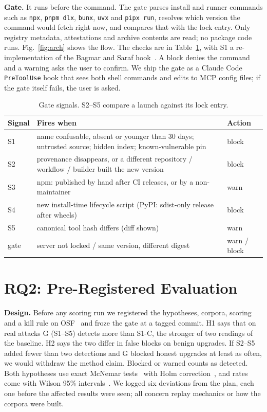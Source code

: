 \documentclass[conference]{IEEEtran}
\newcommand{\G}{\textsf{G}}
\newcommand{\SC}{\textsf{S1-C}}
\newcommand{\code}[1]{\texttt{#1}}
\begin{document}
\textbf{Gate.} It runs before the command. The gate parses install and runner commands such as \code{npx},
\code{pnpm dlx}, \code{bunx}, \code{uvx} and \code{pipx run}, resolves which version the command would fetch right
now, and compares that with the lock entry. Only registry metadata, attestations and archive contents are read; no
package code runs. Fig.~\ref{fig:arch} shows the flow. The checks are in Table~\ref{tab:signals}, with S1 a
re-implementation of the Bagmar and Saraf hook~\cite{bagmar2026setup}. A block denies the command and a warning asks the
user to confirm. We ship the gate as a Claude Code \code{PreToolUse} hook that sees both shell commands and edits to MCP
config files; if the gate itself fails, the user is asked.

\begin{table}[t]
\caption{Gate signals. S2--S5 compare a launch against its lock entry.}
\label{tab:signals}
\centering\footnotesize
\begin{tabular}{@{}lp{4.6cm}l@{}}
\toprule
Signal & Fires when & Action \\
\midrule
S1 & name confusable, absent or younger than 30 days; untrusted source; hidden index; known-vulnerable pin & block \\
S2 & provenance disappears, or a different repository / workflow / builder built the new version & block \\
S3 & npm: published by hand after CI releases, or by a non-maintainer & warn \\
S4 & new install-time lifecycle script (PyPI: sdist-only release after wheels) & block \\
S5 & canonical tool hash differs (diff shown) & warn \\
gate & server not locked / same version, different digest & warn / block \\
\bottomrule
\end{tabular}
\end{table}

\section{RQ2: Pre-Registered Evaluation}
\label{sec:eval}
\textbf{Design.} Before any scoring run we registered the hypotheses, corpora, scoring and a kill rule on
OSF~\cite{osf2026prereg} and froze the gate at a tagged commit. H1 says that on real attacks \G{} (S1--S5) detects more than \SC, the
stronger of two readings of the baseline. H2 says the two differ in false blocks on benign upgrades. If S2--S5 added
fewer than two detections and \G{} blocked honest upgrades at least as often, we would withdraw the method claim. Blocked
or warned counts as detected. Both hypotheses use exact McNemar tests~\cite{mcnemar1947} with Holm
correction~\cite{holm1979}, and rates come with Wilson 95\% intervals~\cite{wilson1927}. We logged six deviations from
the plan, each one before the affected results were seen; all concern replay mechanics or how the corpora were built.
\end{document}
